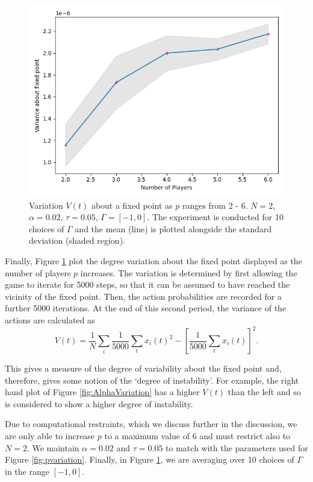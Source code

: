 \documentclass[sigconf,anonymous]{aamas}
\begin{document}
\begin{figure}[t]
    \includegraphics[width = .75\linewidth, center]{Figures/pVarianceExpt.png}
    \caption{Variation $V(t)$ about a fixed point as $p$ ranges from 2 - 6. $N = 2$, $\alpha = 0.02$, $\tau = 0.05$, $\Gamma = [-1, 0]$. The experiment is conducted for 10 choices of $\Gamma$ and the mean (line) is plotted alongside the standard deviation (shaded region).}
    \label{fig:pVarianceExpt}
\end{figure}

Finally, Figure \ref{fig:pVarianceExpt} plot the degree variation about the fixed point displayed as the number of players $p$ increases. The variation is determined by first allowing the game to iterate for 5000 steps, so that it can be assumed to have reached the vicinity of the fixed point. Then, the action probabilities are recorded for a further 5000 iterations. At the end of this second period, the variance of the actions are calculated as
%
\begin{equation*}
    V(t) = \frac{1}{N} \sum_i \frac{1}{5000} \sum_t x_i(t)^2 - \left[\frac{1}{5000} \sum_t x_i(t) \right]^2 .
\end{equation*}

This gives a measure of the degree of variability about the fixed point and, therefore, gives some notion of the `degree of instability'. For example, the right hand plot of Figure \ref{fig:AlphaVariation} has a higher $V(t)$ than the left and so is considered to show a higher degree of instability. 

Due to computational restraints, which we discuss further in the discussion, we are only able to increase $p$ to a maximum value of 6 and must restrict also to $N = 2$. We maintain $\alpha = 0.02$ and $\tau = 0.05$ to match with the parameters used for Figure \ref{fig:pvariation}. Finally, in Figure \ref{fig:pVarianceExpt}, we are averaging over 10 choices of $\Gamma$ in the range $[-1, 0]$. 
\end{document}

